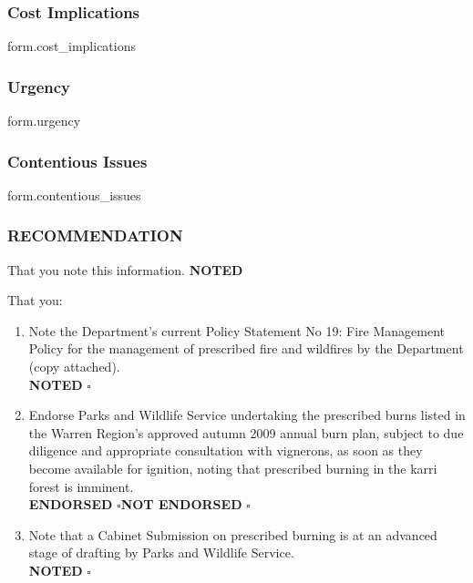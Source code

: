 {%
\subsubsection{Cost Implications}
\normalsize {{form.cost_implications}}
{%

{%
\subsubsection{Urgency}
\normalsize {{form.urgency}}
{%

{%
\subsubsection{Contentious Issues}
\normalsize {{form.contentious_issues}}
{%

\subsubsection{RECOMMENDATION}
{%
\normalsize That you note this information. \hfill \textbf{NOTED} \Huge\square
{%
\normalsize That you:
\begin{enumerate} \itemsep -0pt
\item Note the Department’s current Policy Statement No 19: Fire Management Policy for the management of prescribed fire and wildfires by the Department (copy attached). \\ \hspace*{65mm} \textbf{NOTED} \Huge$\square$\normalsize

\item Endorse Parks and Wildlife Service undertaking the prescribed burns listed in the Warren Region’s approved autumn 2009 annual burn plan, subject to due diligence and appropriate consultation with vignerons, as soon as they become available for ignition, noting that prescribed burning in the karri forest is imminent. \\ \hspace*{65mm} \textbf{ENDORSED} \Huge$\square$\normalsize \textbf{NOT ENDORSED} \Huge$\square$\normalsize

\item Note that a Cabinet Submission on prescribed burning is at an advanced stage of drafting by Parks and Wildlife Service. \\ \hspace*{65mm} \textbf{NOTED} \Huge$\square$\normalsize


\end{enumerate}}}}}}}}}
